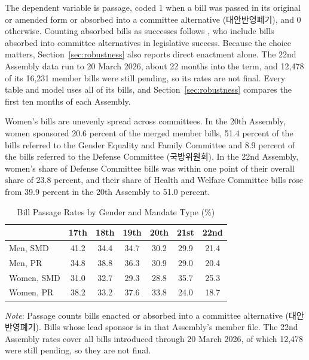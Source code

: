 \documentclass[11pt]{article}
\begin{document}
The dependent variable is passage, coded 1 when a bill was passed in its original or amended form or absorbed into a committee alternative (대안반영폐기), and 0 otherwise. Counting absorbed bills as successes follows \citet{jeon2022}, who include bills absorbed into committee alternatives in legislative success. Because the choice matters, Section~\ref{sec:robustness} also reports direct enactment alone. The 22nd Assembly data run to 20 March 2026, about 22 months into the term, and 12,478 of its 16,231 member bills were still pending, so its rates are not final. Every table and model uses all of its bills, and Section~\ref{sec:robustness} compares the first ten months of each Assembly.

Women's bills are unevenly spread across committees. In the 20th Assembly, women sponsored 20.6 percent of the merged member bills, 51.4 percent of the bills referred to the Gender Equality and Family Committee and 8.9 percent of the bills referred to the Defense Committee (국방위원회). In the 22nd Assembly, women's share of Defense Committee bills was within one point of their overall share of 23.8 percent, and their share of Health and Welfare Committee bills rose from 39.9 percent in the 20th Assembly to 51.0 percent.

\begin{table}[htbp]
\centering
\caption{Bill Passage Rates by Gender and Mandate Type (\%)}
\label{tab:rates}
\begin{tabular}{lcccccc}
\toprule
& 17th & 18th & 19th & 20th & 21st & 22nd \\
\midrule
Men, SMD     & 41.2 & 34.4 & 34.7 & 30.2 & 29.9 & 21.4 \\
Men, PR      & 34.8 & 38.8 & 36.3 & 30.9 & 29.0 & 20.4 \\
Women, SMD   & 31.0 & 32.7 & 29.3 & 28.8 & 35.7 & 25.3 \\
Women, PR    & 38.2 & 33.2 & 37.6 & 33.8 & 24.0 & 18.7 \\
\bottomrule
\end{tabular}

\vspace{4pt}
\parbox{0.92\textwidth}{\footnotesize \textit{Note}: Passage counts bills enacted or absorbed into a committee alternative (대안반영폐기). Bills whose lead sponsor is in that Assembly's member file. The 22nd Assembly rates cover all bills introduced through 20 March 2026, of which 12,478 were still pending, so they are not final.}
\end{table}
\end{document}
